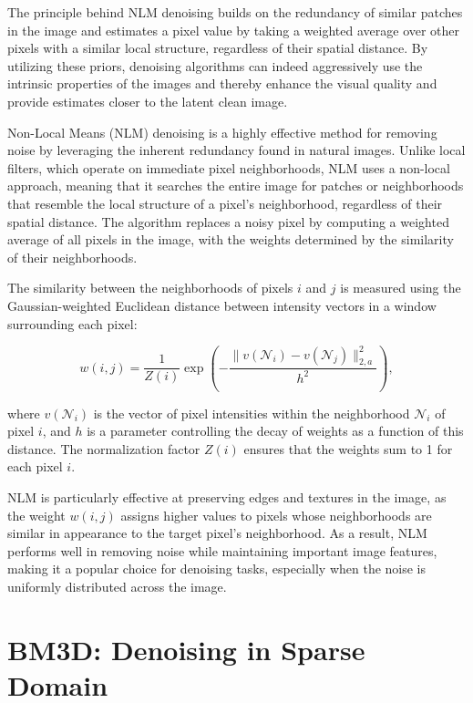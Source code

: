 The principle behind \gls{NLM} denoising builds on the redundancy of similar patches in the image and estimates a pixel value by taking a weighted average over other pixels with a similar local structure, regardless of their spatial distance. By utilizing these priors, denoising algorithms can indeed aggressively use the intrinsic properties of the images and thereby enhance the visual quality and provide estimates closer to the latent clean image.

Non-Local Means (NLM) denoising is a highly effective method for removing noise by leveraging the inherent redundancy found in natural images. Unlike local filters, which operate on immediate pixel neighborhoods, NLM uses a non-local approach, meaning that it searches the entire image for patches or neighborhoods that resemble the local structure of a pixel's neighborhood, regardless of their spatial distance. The algorithm replaces a noisy pixel by computing a weighted average of all pixels in the image, with the weights determined by the similarity of their neighborhoods.

The similarity between the neighborhoods of pixels $i$ and $j$ is measured using the Gaussian-weighted Euclidean distance between intensity vectors in a window surrounding each pixel:

\begin{equation}
    w(i,j) = \frac{1}{Z(i)} \exp \left( -\frac{\|v(\mathcal{N}_i) - v(\mathcal{N}_j)\|_{2,a}^2}{h^2} \right),
\end{equation}

where $v(\mathcal{N}_i)$ is the vector of pixel intensities within the neighborhood $\mathcal{N}_i$ of pixel $i$, and $h$ is a parameter controlling the decay of weights as a function of this distance. The normalization factor $Z(i)$ ensures that the weights sum to 1 for each pixel $i$.

NLM is particularly effective at preserving edges and textures in the image, as the weight $w(i,j)$ assigns higher values to pixels whose neighborhoods are similar in appearance to the target pixel's neighborhood. As a result, NLM performs well in removing noise while maintaining important image features, making it a popular choice for denoising tasks, especially when the noise is uniformly distributed across the image.


\section{BM3D: Denoising in Sparse Domain}

